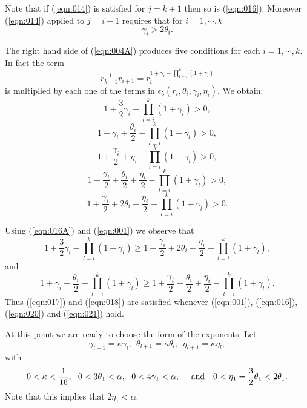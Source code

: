 \documentclass[12pt,leqno]{article}
\theoremstyle{plain}
\numberwithin{equation}{section}
\begin{document}
Note that if (\ref{eqn:014}) is satisfied for $j=k+1$ then so is
(\ref{eqn:016}). Moreover (\ref{eqn:014}) applied to $j=i+1$ requires
that for $i=1,\cdots, k$
\begin{equation}\label{eqn:016A}
\gamma_i > 2\theta_i.
\end{equation}



The right hand side of (\ref{eqn:004A}) produces five conditions for each
$i=1,\cdots, k$. In fact the term
\begin{equation}\label{eqn:016B}
r^{-1}_{k+1} r_{i+1}=r^{1+\gamma_i-\prod^{k}_{l=i}(1+\gamma_l)}_i
\end{equation}
is multiplied by each one of the terms in
$\epsilon_5(r_i,\theta_i,\gamma_i, \eta_i)$. We obtain:
\begin{equation}\label{eqn:017}
1+\frac{3}{2}\gamma_i-\prod^{k}_{l=i}(1+\gamma_l)>0,
\end{equation}
\begin{equation}\label{eqn:018}
1+\gamma_i+\frac{\theta_i}{2}-\prod^{k}_{l=i}(1+\gamma_l)>0,
\end{equation}
\begin{equation}\label{eqn:019}
1+\frac{\gamma_i}{2}+\eta_i-\prod^{k}_{l=i}(1+\gamma_l)>0,
\end{equation}
\begin{equation}\label{eqn:020}
1+\frac{\gamma_i}{2}+\frac{\theta_i}{2}+\frac{\eta_i}{2}
-\prod^{k}_{l=i}(1+\gamma_l)>0,
\end{equation}
\begin{equation}\label{eqn:021}
1+\frac{\gamma_i}{2}+2{\theta_i}-\frac{\eta_i}{2}
-\prod^{k}_{l=i}(1+\gamma_l)>0.
\end{equation}

Using (\ref{eqn:016A}) and (\ref{eqn:001}) we observe that
\begin{equation}\label{eqn:022}
1+\frac{3}{2}\gamma_i-\prod^{k}_{l=i}(1+\gamma_l)
\ge 1+\frac{\gamma_i}{2}+2{\theta_i}-\frac{\eta_i}{2}
-\prod^{k}_{l=i}(1+\gamma_l),
\end{equation}
and
\begin{equation}\label{eqn:023}
1+\gamma_i+\frac{\theta_i}{2}-\prod^{k}_{l=i}(1+\gamma_l)\ge
1+\frac{\gamma_i}{2}+\frac{\theta_i}{2}+\frac{\eta_i}{2}
-\prod^{k}_{l=i}(1+\gamma_l).
\end{equation}
Thus (\ref{eqn:017}) and (\ref{eqn:018}) are satisfied
whenever (\ref{eqn:001}), (\ref{eqn:016}), (\ref{eqn:020}) and (\ref{eqn:021})
hold.

At this point we are ready to choose the form of the exponents. Let
\begin{equation}\label{eqn:024}
\gamma_{l+1}=\kappa\gamma_l,\ \ \theta_{l+1}=\kappa\theta_l,\ \
\eta_{l+1}=\kappa\eta_l,
\end{equation}
with
\begin{equation}\label{eqn:025}
0<\kappa<\frac{1}{16},\ \ 0 <3\theta_1<\alpha,\ \
0<4\gamma_1<\alpha,\ \ \ \hbox{ and }\ \
0<\eta_1=\frac{3}{2}\theta_1<2\theta_1.
\end{equation}
Note that this implies that $2\eta_1<\alpha$.
\end{document}
